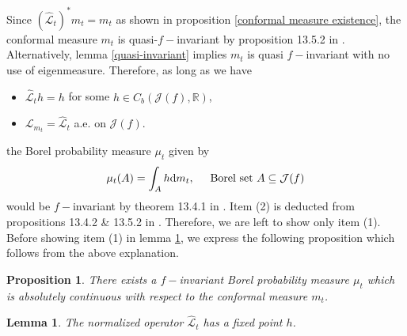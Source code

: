 \documentclass[12pt,reqno]{amsart}
\newtheorem{lemma}[theorem]{Lemma}
\newtheorem{proposition}[theorem]{Proposition}
\begin{document}
\noindent Since $(\hat{\mathcal{L}}_t)^*m_t=m_t$ as shown in proposition \ref{conformal measure existence}, the conformal measure $m_t$ is quasi-$f-$invariant by proposition 13.5.2 in \citep[p. 453]{Munday}. Alternatively, lemma \ref{quasi-invariant} implies $m_t$ is quasi $f-$invariant with no use of eigenmeasure. Therefore, as long as we have 
\begin{itemize}
    \item[(1)] $\hat{\mathcal{L}}_th=h$ \;\;\;\; for some $h \in C_b(\mathcal{J}(f),\mathbb{R})$,
    \item[(2)] $\mathcal{L}_{m_t}=\hat{\mathcal{L}}_t$ \;\;\; a.e. on $\mathcal{J}(f)$.
\end{itemize} 
the Borel probability measure $\mu_t$ given by 
\begin{equation}\label{invariant measure}
    \mu_t(A)=\int_A h\text{d}m_t, \hspace{.5cm} \text{Borel set $A \subseteq \mathcal{J}(f)$}
\end{equation}
would be $f-$invariant by theorem 13.4.1 in \citep[p. 451]{Munday}. Item (2) is deducted from propositions 13.4.2 \& 13.5.2 in \citep[p. 451, 453]{Munday}. Therefore, we are left to show only item (1). Before showing item (1) in lemma \ref{fixed point of nomalized operator}, we express the following proposition which follows from the above explanation.
\begin{proposition}\label{existence Gibbs}
    There exists a $f-$invariant Borel probability measure $\mu_t$ which is absolutely continuous with respect to the conformal measure $m_t$.
\end{proposition}
\begin{lemma}\label{fixed point of nomalized operator}
    The normalized operator $\hat{\mathcal{L}}_t$ has a fixed point $h$.
\end{lemma}
\end{document}

